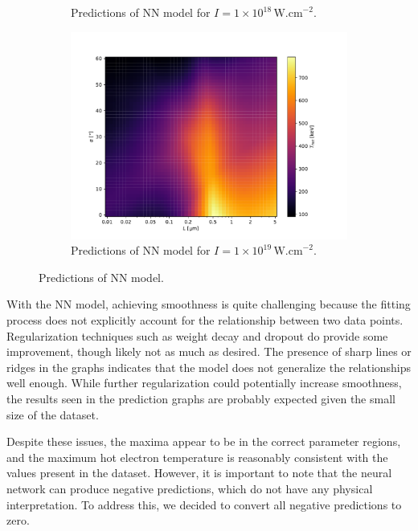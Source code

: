 \begin{figure}[ht]
\begin{subfigure}{0.49\textwidth}
		\caption{Predictions of NN model for $I = 1 \times 10^{18} \, \mathrm{W.cm}^{-2}$.}
		\label{fig:nn-pred-b}
	\end{subfigure}
	\begin{subfigure}{0.59\textwidth}
		\centering
		\includegraphics[width=\textwidth]{figures/nn19_pred}
		\caption{Predictions of NN model for $I = 1 \times 10^{19} \, \mathrm{W.cm}^{-2}$.}
		\label{fig:nn-pred-c}
	\end{subfigure}
	\caption{Predictions of NN model.}
	\label{fig:nn-pred}
\end{figure}

With the NN model, achieving smoothness is quite challenging because the fitting process does not explicitly account for the relationship between two data points. Regularization techniques such as weight decay and dropout do provide some improvement, though likely not as much as desired. The presence of sharp lines or ridges in the graphs indicates that the model does not generalize the relationships well enough. While further regularization could potentially increase smoothness, the results seen in the prediction graphs are probably expected given the small size of the dataset.

Despite these issues, the maxima appear to be in the correct parameter regions, and the maximum hot electron temperature is reasonably consistent with the values present in the dataset. However, it is important to note that the neural network can produce negative predictions, which do not have any physical interpretation. To address this, we decided to convert all negative predictions to zero.

